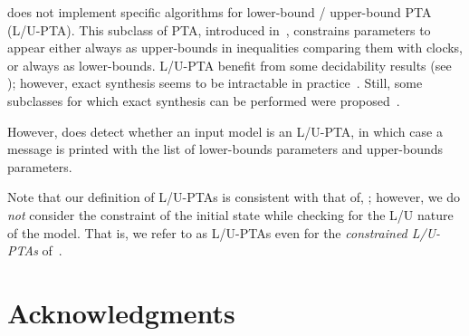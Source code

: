 \imitator{} does not implement specific algorithms for lower-bound / upper-bound PTA (L/U-PTA).
This subclass of PTA, introduced in~\cite{HRSV02}, constrains parameters to appear either always as upper-bounds in inequalities comparing them with clocks, or always as lower-bounds.
L/U-PTA benefit from some decidability results (see \eg{} \cite{HRSV02,BlT09,JLR15,ALime17,ALM20}); however, exact synthesis seems to be intractable in practice~\cite{JLR15,ALR16ICFEM}.
Still, some subclasses for which exact synthesis can be performed were proposed~\cite{BlT09,ALR18FORMATS}.

However, \imitator{} does detect whether an input model is an L/U-PTA, in which case a message is printed with the list of lower-bounds parameters and upper-bounds parameters.

\begin{remark}
	Note that our definition of L/U-PTAs is consistent with that of, \eg{} \cite{BlT09}; however, we do \emph{not} consider the constraint of the initial state while checking for the L/U nature of the model.
	That is, we refer to as L/U-PTAs even for the \emph{constrained L/U-PTAs} of~\cite{BlT09}.
\end{remark}




\chapter{Acknowledgments}

